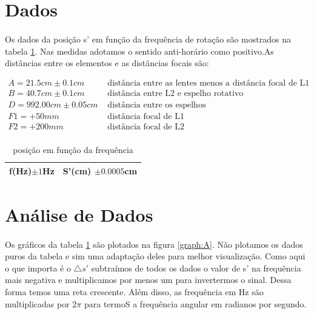 \documentclass[a4paper,11pt]{article}
\begin{document}
\section{Dados}

\paragraph{} Os dados da posição s' em função da frequência de rotação
são mostrados na tabela \ref{tab:dataA}. Nas medidas adotamos o sentido
anti-horário como positivo.As distâncias entre os elementos e as distâncias focais são:

\begin{equation}
	\begin{array}{ll}
	A = 21.5 cm \pm  0.1 cm & \mbox{ distância entre as lentes menos a distância focal de L1} \\
	B = 40.7 cm \pm  0.1 cm & \mbox{ distância entre L2 e espelho rotativo} \\
	D = 992.00 cm \pm  0.05 cm & \mbox{ distância entre os espelhos}  \\
	F1 = +50 mm & \mbox{ distância focal de L1}  \\
	F2 = +200 mm & \mbox{ distância focal de L2}  \\	
	\end{array}
\end{equation}


\FloatBarrier
\begin{table}
\centering
	\begin{tabular}{|l|l|}\hline
	f(Hz)$\pm 1$Hz & S'(cm) $\pm 0.0005$cm \\ \hline
	
	\end{tabular}
\caption{posição em função da frequência}
\label{tab:dataA}
\end{table}
\FloatBarrier

\section{Análise de Dados}

\paragraph{} Os gráficos da tabela \ref{tab:dataA} são plotados na figura 
\ref{graph:A}. Não plotamos os dados puros da tabela e sim uma adaptação deles
para melhor visualização. Como aqui o que importa é o $\triangle s'$ subtraímos
de todos os dados o valor de s' na frequência mais negativa e multiplicamos por menos um para invertermos o sinal. Dessa forma temos uma reta crescente. Além disso, as frequência 
em Hz são multiplicadas por $2\pi$ para termoS a frequência angular em radianos por
segundo.
\end{document}
